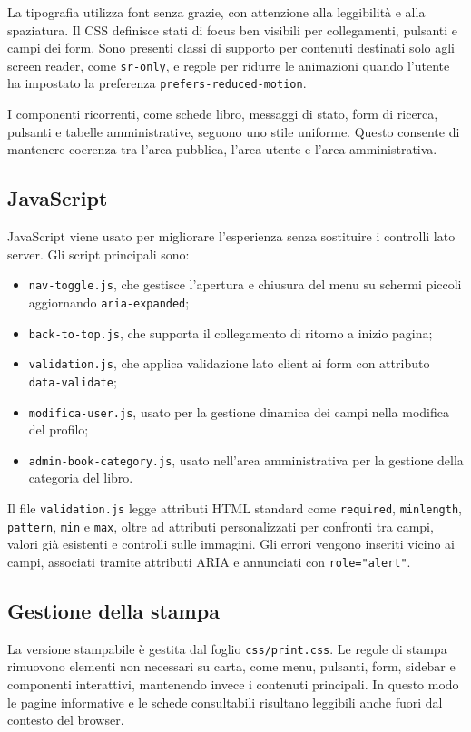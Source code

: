 ﻿\documentclass{article}
\begin{document}
La tipografia utilizza font senza grazie, con attenzione alla leggibilità e alla spaziatura. Il CSS definisce stati di focus ben visibili per collegamenti, pulsanti e campi dei form. Sono presenti classi di supporto per contenuti destinati solo agli screen reader, come \texttt{sr-only}, e regole per ridurre le animazioni quando l'utente ha impostato la preferenza \texttt{prefers-reduced-motion}.

I componenti ricorrenti, come schede libro, messaggi di stato, form di ricerca, pulsanti e tabelle amministrative, seguono uno stile uniforme. Questo consente di mantenere coerenza tra l'area pubblica, l'area utente e l'area amministrativa.

\subsection{JavaScript}
JavaScript viene usato per migliorare l'esperienza senza sostituire i controlli lato server. Gli script principali sono:

\begin{itemize}
    \item \texttt{nav-toggle.js}, che gestisce l'apertura e chiusura del menu su schermi piccoli aggiornando \texttt{aria-expanded};
    \item \texttt{back-to-top.js}, che supporta il collegamento di ritorno a inizio pagina;
    \item \texttt{validation.js}, che applica validazione lato client ai form con attributo \texttt{data-validate};
    \item \texttt{modifica-user.js}, usato per la gestione dinamica dei campi nella modifica del profilo;
    \item \texttt{admin-book-category.js}, usato nell'area amministrativa per la gestione della categoria del libro.
\end{itemize}

Il file \texttt{validation.js} legge attributi HTML standard come \texttt{required}, \texttt{minlength}, \texttt{pattern}, \texttt{min} e \texttt{max}, oltre ad attributi personalizzati per confronti tra campi, valori già esistenti e controlli sulle immagini. Gli errori vengono inseriti vicino ai campi, associati tramite attributi ARIA e annunciati con \texttt{role="alert"}.

\subsection{Gestione della stampa}
La versione stampabile è gestita dal foglio \texttt{css/print.css}. Le regole di stampa rimuovono elementi non necessari su carta, come menu, pulsanti, form, sidebar e componenti interattivi, mantenendo invece i contenuti principali. In questo modo le pagine informative e le schede consultabili risultano leggibili anche fuori dal contesto del browser.
\end{document}

